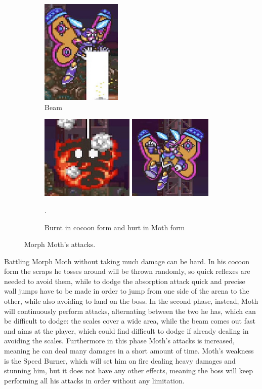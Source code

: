\begin{figure}
	\ContinuedFloat
	\centering
	\begin{subfigure}{0.4\linewidth}
		\centering
		\includegraphics[height=5cm]{figures/X2/Morph_moth/Moth_beam.jpg}
		\caption{Beam}
	\end{subfigure}
	\begin{subfigure}{\linewidth}
		\centering
		\includegraphics[height=4cm]{figures/X2/Morph_moth/Moth_burn.jpg}
		\includegraphics[height=4cm]{figures/X2/Morph_moth/Moth_hurt.jpg}
		\caption{Burnt in cocoon form and hurt in Moth form}.
	\end{subfigure}
	\caption{Morph Moth's attacks.}
\end{figure}


Battling Morph Moth without taking much damage can be hard. In his cocoon form the scraps he tosses around will be thrown randomly, so quick reflexes are needed to avoid them, while to dodge the absorption attack quick and precise wall jumps have to be made in order to jump from one side of the arena to the other, while also avoiding to land on the boss. In the second phase, instead, Moth will continuously perform attacks, alternating between the two he has, which can be difficult to dodge: the scales cover a wide area, while the beam comes out fast and aims at the player, which could find difficult to dodge if already dealing in avoiding the scales. Furthermore in this phase Moth's attacks is increased, meaning  he can deal many damages in a short amount of time. Moth's weakness is the Speed Burner, which will set him on fire dealing heavy damages and stunning him, but it does not have any other effects, meaning the boss will keep performing all his attacks in order without any limitation.

